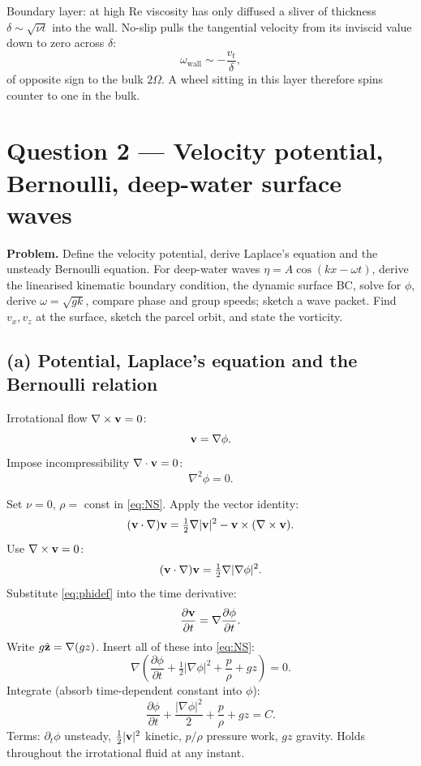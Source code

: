 \documentclass[11pt]{article}
\newcommand{\pd}[2]{\frac{\partial #1}{\partial #2}}
\newcommand{\Lap}{\nabla^{2}}
\begin{document}
Boundary layer: at high Re viscosity has only diffused a sliver of thickness $\delta\sim\sqrt{\nu t}$ into the wall. No-slip pulls the tangential velocity from its inviscid value down to zero across $\delta$:
\[ \omega_\text{wall} \sim -\frac{v_t}{\delta}, \]
of opposite sign to the bulk $2\Omega$. A wheel sitting in this layer therefore spins counter to one in the bulk.

\section*{Question 2 --- Velocity potential, Bernoulli, deep-water surface waves}

\textbf{Problem.} Define the velocity potential, derive Laplace's equation and the unsteady Bernoulli equation. For deep-water waves $\eta=A\cos(kx-\omega t)$, derive the linearised kinematic boundary condition, the dynamic surface BC, solve for $\phi$, derive $\omega=\sqrt{gk}$, compare phase and group speeds; sketch a wave packet. Find $v_x,v_z$ at the surface, sketch the parcel orbit, and state the vorticity.

\subsection*{(a) Potential, Laplace's equation and the Bernoulli relation}

Irrotational flow $\nabla\times\vb v=0$:
\begin{equation}
\vb v = \nabla\phi.
\label{eq:phidef}
\end{equation}
Impose incompressibility $\nabla\cdot\vb v=0$:
\begin{equation}
\Lap\phi = 0.
\label{eq:laplacephi}
\end{equation}

Set $\nu=0$, $\rho=$ const in \eqref{eq:NS}. Apply the vector identity:
\[ (\vb v\cdot\nabla)\vb v = \tfrac12\nabla|\vb v|^2 - \vb v\times(\nabla\times\vb v). \]
Use $\nabla\times\vb v=0$:
\[ (\vb v\cdot\nabla)\vb v = \tfrac12\nabla|\nabla\phi|^2. \]
Substitute \eqref{eq:phidef} into the time derivative:
\[ \pd{\vb v}{t} = \nabla\pd{\phi}{t}. \]
Write $g\hat{\vb z}=\nabla(gz)$. Insert all of these into \eqref{eq:NS}:
\[ \nabla\!\left(\pd{\phi}{t}+\tfrac12|\nabla\phi|^2+\frac{p}{\rho}+gz\right) = 0. \]
Integrate (absorb time-dependent constant into $\phi$):
\begin{equation}
\boxed{\;\pd{\phi}{t}+\frac{|\nabla\phi|^2}{2}+\frac{p}{\rho}+gz = C.\;}
\label{eq:bernoulli}
\end{equation}
Terms: $\partial_t\phi$ unsteady, $\tfrac12|\vb v|^2$ kinetic, $p/\rho$ pressure work, $gz$ gravity. Holds throughout the irrotational fluid at any instant.
\end{document}
